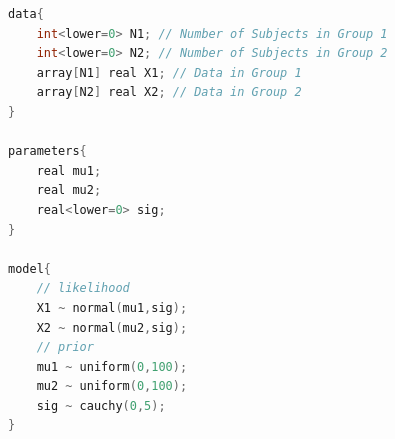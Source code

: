 \begin{lstlisting}[language=C++,label={stan::19_01},caption={二群の平均値のコード}]
data{
    int<lower=0> N1; // Number of Subjects in Group 1
    int<lower=0> N2; // Number of Subjects in Group 2
    array[N1] real X1; // Data in Group 1
    array[N2] real X2; // Data in Group 2
}

parameters{
    real mu1;
    real mu2;
    real<lower=0> sig;
}

model{
    // likelihood
    X1 ~ normal(mu1,sig);
    X2 ~ normal(mu2,sig);
    // prior
    mu1 ~ uniform(0,100);
    mu2 ~ uniform(0,100);
    sig ~ cauchy(0,5);
}

\end{lstlisting}
